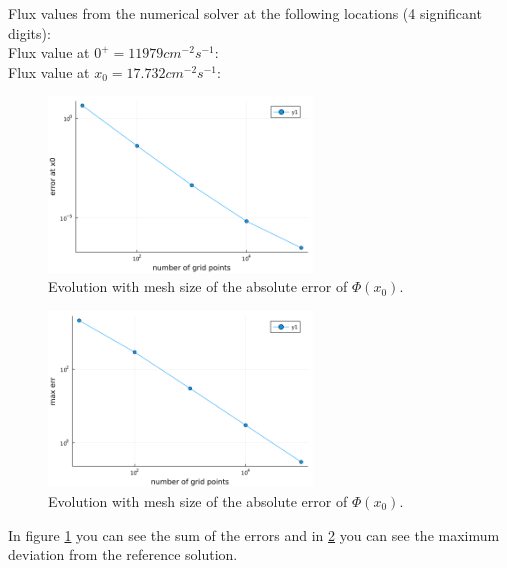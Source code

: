 \documentclass[11pt,a4paper]{article}
\begin{document}
Flux values from the numerical solver at the following locations (4 significant digits):\\
Flux value at $0^+ = 11979 cm^{-2} s^{-1}$: \\
Flux value at $x_0 = 17.732 cm^{-2} s^{-1}$: \\


\begin{figure}[h]
\includegraphics[width=7cm]{../figs/ex1/err_x0.png}
\centering
\caption{Evolution with mesh size of the absolute error of $\Phi(x_0)$.}
\label{sumerr}
\end{figure}
\begin{figure}[h]
\includegraphics[width=7cm]{../figs/ex1/max_errors.png}
\centering
\caption{Evolution with mesh size of the absolute error of $\Phi(x_0)$.}
\label{maxerr}
\end{figure}

In figure \ref{sumerr} you can see the sum of the errors and in \ref{maxerr} you can see the maximum deviation from the reference solution.


\end{document}
